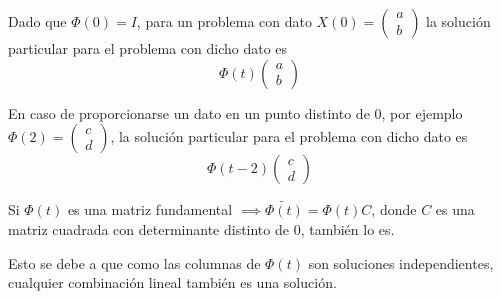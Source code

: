 \obs
Dado que $\Phi(0) = I$, para un problema con dato $X(0) = \begin{pmatrix}
a\\b
\end{pmatrix}$ la solución particular para el problema con dicho dato es $$\Phi(t)\begin{pmatrix}
a\\b
\end{pmatrix}$$

En caso de proporcionarse un dato en un punto distinto de $0$, por ejemplo $\Phi(2) = \begin{pmatrix}
c\\d
\end{pmatrix}$, la solución particular para el problema con dicho dato es
$$\Phi(t-2)\begin{pmatrix}
c\\d
\end{pmatrix}$$

\obs
Si $\Phi(t)$ es una matriz fundamental $\implies \tilde{\Phi(t)} = \Phi(t)C$, donde $C$ es una matriz cuadrada con determinante distinto de $0$, también lo es.

Esto se debe a que como las columnas de $\Phi(t)$ son soluciones independientes, cualquier combinación lineal también es una solución.


